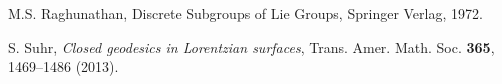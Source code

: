 \documentclass[12pt]{amsart}
\theoremstyle{plain}
\theoremstyle{definition}
\theoremstyle{remark}
\begin{document}
\begin{thebibliography}{GGGG}
		 {\sc  M.S. Raghunathan}, Discrete Subgroups of Lie Groups, Springer Verlag, 1972.
		
		 {\sc S. Suhr}, {\it Closed geodesics in Lorentzian surfaces},  	Trans. Amer. Math. Soc. {\bf 365}, 1469--1486 (2013).
		
		
		
	\end{thebibliography}
	
	\appendix 
	
	
	
\end{document}
